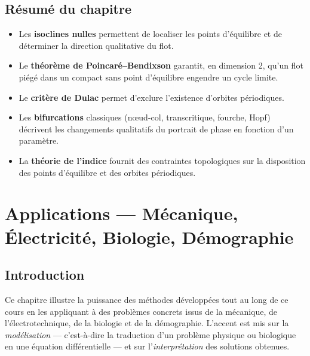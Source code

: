 \documentclass[12pt,a4paper,openany]{book}
\theoremstyle{definition}
\theoremstyle{plain}
\theoremstyle{remark}
\begin{document}
\section*{Résumé du chapitre}

\begin{itemize}
  \item Les \textbf{isoclines nulles} permettent de localiser les
        points d'équilibre et de déterminer la direction qualitative
        du flot.
  \item Le \textbf{théorème de Poincaré--Bendixson} garantit, en
        dimension 2, qu'un flot piégé dans un compact sans point
        d'équilibre engendre un cycle limite.
  \item Le \textbf{critère de Dulac} permet d'exclure l'existence
        d'orbites périodiques.
  \item Les \textbf{bifurcations} classiques (n\oe ud-col,
        transcritique, fourche, Hopf) décrivent les changements
        qualitatifs du portrait de phase en fonction d'un paramètre.
  \item La \textbf{théorie de l'indice} fournit des contraintes
        topologiques sur la disposition des points d'équilibre et
        des orbites périodiques.
\end{itemize}


\chapter{Applications --- Mécanique, Électricité, Biologie, Démographie}
\label{chap:applications}

\section*{Introduction}

Ce chapitre illustre la puissance des méthodes développées tout au
long de ce cours en les appliquant à des problèmes concrets issus
de la mécanique, de l'électrotechnique, de la biologie et de la
démographie. L'accent est mis sur la \emph{modélisation} ---
c'est-à-dire la traduction d'un problème physique ou biologique
en une équation différentielle --- et sur l'\emph{interprétation}
des solutions obtenues.
\end{document}
